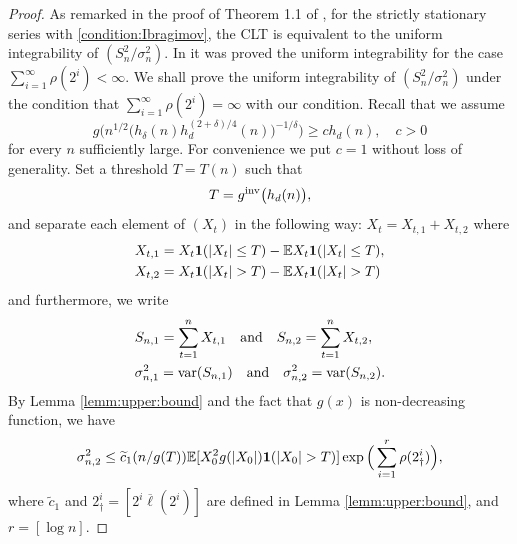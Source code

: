 \documentclass[11pt,a4,leqno]{amsart}
\newcommand{\var}{{\rm var}}
\newcommand{\ov}{\overline}
\newcommand{\wt}{\widetilde}
\newcommand{\E }{{\mathbb E}}
\newcommand{\1}{{\mathbf 1}}
\begin{document}
\begin{proof}
As remarked in the proof of Theorem 1.1 of \cite{peligrad:1987}, for the strictly stationary series with 
\eqref{condition:Ibragimov}, the CLT is equivalent to the uniform integrability of $(S_n^2/\sigma_n^2)$. 
In \cite{peligrad:1982} it was proved the uniform integrability for the case $\sum_{i=1}^\infty \rho(2^i)<\infty$.
We shall prove the uniform integrability of 
$(S_n^2/\sigma_n^2)$ under the condition that $\sum_{i=1}^\infty \rho(2^i)=\infty$ with our condition. Recall that we assume 
\[
 g\Big(
n^{1/2} \big(h_\delta(n)h_d^{(2+\delta)/4}(n) \big)^{-1/\delta}\Big) \ge c h_d(n),\quad c>0 
\]
for every $n$ sufficiently large. For convenience we put $c=1$ without loss of generality. 
Set a threshold $T=T(n)$ such that
\[
 T = g^{\rm inv} \big(h_d(n)\big),
\] 
and separate each element of $(X_t)$ in the following way:
$X_t=X_{t,1}+X_{t,2}$ where 
\begin{align*}
 X_{t,1} &= X_t {\bf 1}(|X_t|\le T)- \E X_t {\bf 1}(|X_t|\le T), \\
 X_{t,2} &= X_t{\bf 1}(|X_t| > T) -\E X_t {\bf 1}(|X_t| > T) 
\end{align*}
and furthermore, we write 
\begin{align*}
& S_{n,1}= \sum_{t=1}^n X_{t,1}\quad \text{and}\quad S_{n,2}=\sum_{t=1}^n X_{t,2},  \\
& \sigma_{n,1}^2 = \var (S_{n,1})\quad \text{and}\quad \sigma_{n,2}^2 =\var (S_{n,2}). 
\end{align*}
By Lemma \ref{lemm:upper:bound} and the fact that $g(x)$ is non-decreasing function, 
we have
\[
 \sigma_{n,2}^2 \le \wt c_1 (n/g(T)) \E [X_0^2 g(|X_0|){\bf 1}(|X_0|>T)] \exp\Big(
\sum_{i=1}^r \rho (2_\dag^i)
\Big),
\]
where $\wt c_1$ and $2^{i}_\dag = [2^i \ov \ell (2^i)]$ are defined in Lemma \ref{lemm:upper:bound}, 
and $r=[\log n]$.


\end{proof}
\end{document}
